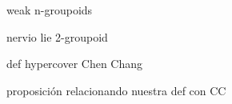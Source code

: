 %
%

\noi weak n-groupoids

\bigskip

\noi nervio lie 2-groupoid

\bigskip

\noi def hypercover Chen Chang

\bigskip

\noi proposición relacionando nuestra def con CC

